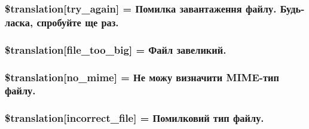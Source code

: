 \subsubsection[{\$translation}]{\setlength{\rightskip}{0pt plus 5cm}\$translation\mbox{[}\textquotesingle{}try\+\_\+again\textquotesingle{}\mbox{]} = \textquotesingle{}Помилка завантаження файлу. Будь-\/ласка, спробуйте ще раз.\textquotesingle{}}\label{class_8upload_8uk___u_a_8php_a3afc377bd803683314f413a814243066}
\hypertarget{class_8upload_8uk___u_a_8php_a476278eb4a0c3df56af068e2d511a741}{}
\subsubsection[{\$translation}]{\setlength{\rightskip}{0pt plus 5cm}\$translation\mbox{[}\textquotesingle{}file\+\_\+too\+\_\+big\textquotesingle{}\mbox{]} = \textquotesingle{}Файл завеликий.\textquotesingle{}}\label{class_8upload_8uk___u_a_8php_a476278eb4a0c3df56af068e2d511a741}
\hypertarget{class_8upload_8uk___u_a_8php_a191a55df8e3bb7f3c51b70f3c1932e02}{}
\subsubsection[{\$translation}]{\setlength{\rightskip}{0pt plus 5cm}\$translation\mbox{[}\textquotesingle{}no\+\_\+mime\textquotesingle{}\mbox{]} = \textquotesingle{}Не можу визначити M\+I\+M\+E-\/тип файлу.\textquotesingle{}}\label{class_8upload_8uk___u_a_8php_a191a55df8e3bb7f3c51b70f3c1932e02}
\hypertarget{class_8upload_8uk___u_a_8php_a4d32343e2699edd6fd435f9c832cb9c7}{}
\subsubsection[{\$translation}]{\setlength{\rightskip}{0pt plus 5cm}\$translation\mbox{[}\textquotesingle{}incorrect\+\_\+file\textquotesingle{}\mbox{]} = \textquotesingle{}Помилковий тип файлу.\textquotesingle{}}\label{class_8upload_8uk___u_a_8php_a4d32343e2699edd6fd435f9c832cb9c7}
\hypertarget{class_8upload_8uk___u_a_8php_a0dd3e4930ca1f59ae280f4b1006525cd}{}
